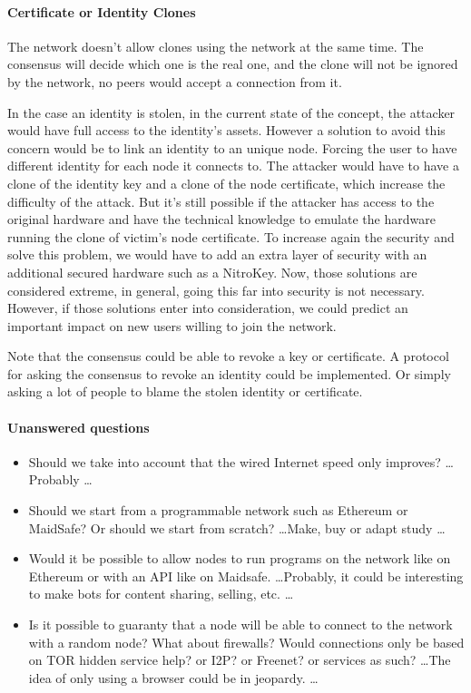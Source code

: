 \paragraph{Certificate or Identity Clones} The network doesn't allow clones using the network at the same time. The consensus will decide which one is the real one, and the clone will not be ignored by the network, no peers would accept a connection from it.

In the case an identity is stolen, in the current state of the concept, the attacker would have full access to the identity's assets. However a solution to avoid this concern would be to link an identity to an unique node. Forcing the user to have different identity for each node it connects to. The attacker would have to have a clone of the identity key and a clone of the node certificate, which increase the difficulty of the attack. But it's still possible if the attacker has access to the original hardware and have the technical knowledge to emulate the hardware running the clone of victim's node certificate. To increase again the security and solve this problem, we would have to add an extra layer of security with an additional secured hardware such as a NitroKey\cite{NitrokeyNitokey}. Now, those solutions are considered extreme, in general, going this far into security is not necessary.  However, if those solutions enter into consideration, we could predict an important impact on new users willing to join the network.

Note that the consensus could be able to revoke a key or certificate. A protocol for asking the consensus to revoke an identity could be implemented. Or simply asking a lot of people to blame the stolen identity or certificate.

\paragraph{Unanswered questions}
\begin{itemize}
\item Should we take into account that the wired Internet speed only improves?
\dots Probably \dots

\item Should we start from a programmable network such as Ethereum or MaidSafe? Or should we start from scratch?
\dots Make, buy or adapt study \dots

\item Would it be possible to allow nodes to run programs on the network like on Ethereum or with an API like on Maidsafe\cite{MaidSafe2014MaidSafe.netCommunity}.
\dots Probably, it could be interesting to make bots for content sharing, selling, etc. \dots

\item Is it possible to guaranty that a node will be able to connect to the network with a random node? What about firewalls? Would connections only be based on TOR hidden service help? or I2P? or Freenet? or services as such? 
\dots The idea of only using a browser could be in jeopardy. \dots

\end{itemize}

